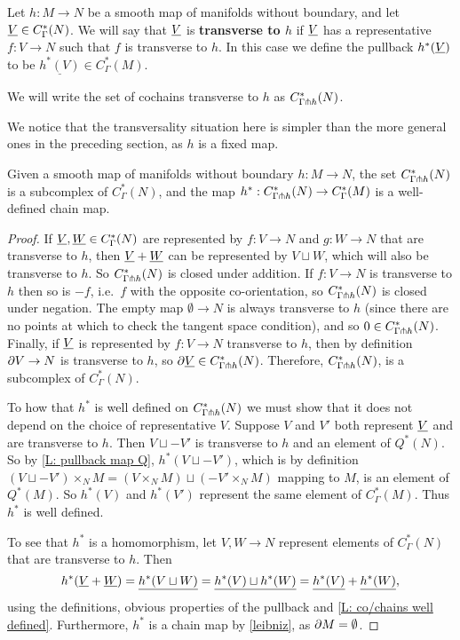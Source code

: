 \begin{definition}\label{D: transverse to map}
	Let $h \colon M \to N$ be a smooth map of manifolds without boundary, and let $\underline{V} \in C^*_\Gamma(N)$.
	We will say that $\underline{V}$ is \textbf{transverse to $h$} if $\underline{V}$ has a representative $f \colon V \to N$ such that $f$ is transverse to $h$.
	In this case we define the pullback $h^*(\underline{V})$ to be $\underline{h^*(V)} \in C^*_\Gamma(M)$.

	We will write the set of cochains transverse to $h$ as $C^*_{\Gamma\pitchfork h}(N)$.
\end{definition}

We notice that the transversality situation here is simpler than the more general ones in the preceding section, as $h$ is a fixed map.

\begin{proposition}
	Given a smooth map of manifolds without boundary $h \colon M \to N$, the set $C^*_{\Gamma\pitchfork h}(N)$ is a subcomplex of $C^*_{\Gamma}(N)$, and the map $h^*:C^*_{\Gamma\pitchfork h}(N) \to C^*_{\Gamma}(M)$ is a well-defined chain map.
\end{proposition}

\begin{proof}
	If $\underline{V},\underline{W} \in C^*_\Gamma(N)$ are represented by $f \colon V \to N$ and $g \colon W \to N$ that are transverse to $h$, then $\underline{V}+\underline{W}$ can be represented by $V \sqcup W$, which will also be transverse to $h$.
	So $C^*_{\Gamma\pitchfork h}(N)$ is closed under addition.
	If $f \colon V \to N$ is transverse to $h$ then so is $-f$, i.e.\ $f$ with the opposite co-orientation, so $C^*_{\Gamma\pitchfork h}(N)$ is closed under negation.
	The empty map $\emptyset \to N$ is always transverse to $h$ (since there are no points at which to check the tangent space condition), and so $0 \in C^*_{\Gamma\pitchfork h}(N)$.
	Finally, if $\underline{V}$ is represented by $f \colon V \to N$ transverse to $h$, then by definition $\partial V \to N$ is transverse to $h$, so $\partial \underline{V} \in C^*_{\Gamma\pitchfork h}(N)$.
	Therefore, $C^*_{\Gamma\pitchfork h}(N)$, is a subcomplex of $C^*_{\Gamma}(N)$.

	To how that $h^*$ is well defined on $C^*_{\Gamma\pitchfork h}(N)$ we must show that it does not depend on the choice of representative $V$.
	Suppose $V$ and $V'$ both represent $\underline{V}$ and are transverse to $h$.
	Then $V \sqcup -V'$ is transverse to $h$ and an element of $Q^*(N)$.
	So by \cref{L: pullback map Q}, $h^*(V \sqcup -V')$, which is by definition $(V \sqcup -V') \times_N M = (V \times_N M) \sqcup (-V' \times_N M)$ mapping to $M$, is an element of $Q^*(M)$.
	So $h^*(V)$ and $h^*(V')$ represent the same element of $C^*_{\Gamma}(M)$.
	Thus $h^*$ is well defined.

	To see that $h^*$ is a homomorphism, let $V,W \to N$ represent elements of $C^*_{\Gamma}(N)$ that are transverse to $h$.
	Then
	$$h^*(\underline{V}+\underline{W}) = \underline{h^*(V \sqcup W)} = \underline{h^*(V) \sqcup h^*(W)} = \underline{h^*(V)}+\underline{h^*(W)},$$
	using the definitions, obvious properties of the pullback and \cref{L: co/chains well defined}.
	Furthermore, $h^*$ is a chain map by \cref{leibniz}, as $\partial M = \emptyset$.
\end{proof}

